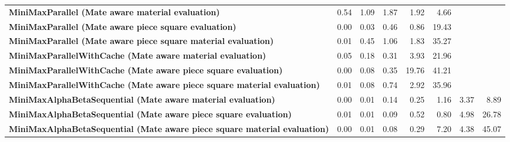 \begin{table}[H]
{\begin{tabular}{|p{8cm}|*{7}{r|}}
            \rowcolor[HTML]{FFFFFF}
            \textbf{MiniMaxParallel (Mate aware material evaluation)}                                   & 0.54                                  & 1.09                                  & 1.87                                  & 1.92                                  & 4.66 &  &  \\
            \rowcolor[HTML]{EFEFEF}
            \textbf{MiniMaxParallel (Mate aware piece square evaluation)}                               & 0.00                                  & 0.03                                  & 0.46                                  & 0.86 & 19.43 &  &  \\
            \rowcolor[HTML]{FFFFFF}
            \textbf{MiniMaxParallel (Mate aware piece square material evaluation)}                      & 0.01                                  & 0.45 & 1.06 & 1.83 & 35.27 &  &  \\

            \rowcolor[HTML]{EFEFEF}
            \textbf{MiniMaxParallelWithCache (Mate aware material evaluation)}                          & 0.05                                  & 0.18                                  & 0.31 & 3.93 & 21.96 &  &  \\
            \rowcolor[HTML]{FFFFFF}
            \textbf{MiniMaxParallelWithCache (Mate aware piece square evaluation)}                      & 0.00                                  & 0.08 & 0.35 & 19.76 & 41.21 &  &  \\
            \rowcolor[HTML]{EFEFEF}
            \textbf{MiniMaxParallelWithCache (Mate aware piece square material evaluation)}             & 0.01 & 0.08 & 0.74 & 2.92 & 35.96 &  &  \\

            \rowcolor[HTML]{FFFFFF}
            \textbf{MiniMaxAlphaBetaSequential (Mate aware material evaluation)}                        & 0.00                                  & 0.01                                  & 0.14 & 0.25 & 1.16 & 3.37 & 8.89 \\
            \rowcolor[HTML]{EFEFEF}
            \textbf{MiniMaxAlphaBetaSequential (Mate aware piece square evaluation)}                    & 0.01                                  & 0.01 & 0.09 & 0.52 & 0.80 & 4.98 & 26.78 \\
            \rowcolor[HTML]{FFFFFF}
            \textbf{MiniMaxAlphaBetaSequential (Mate aware piece square material evaluation)}               & 0.00 & 0.01 & 0.08 & 0.29 & 7.20 & 4.38 & 45.07 \\


\end{tabular}}
\end{table}
